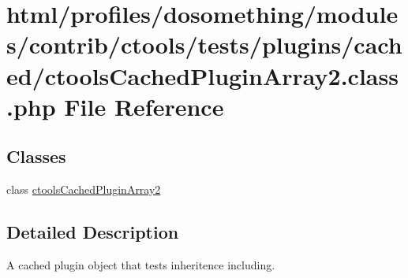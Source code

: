 \hypertarget{ctoolsCachedPluginArray2_8class_8php}{
\section{html/profiles/dosomething/modules/contrib/ctools/tests/plugins/cached/ctoolsCachedPluginArray2.class.php File Reference}
\label{ctoolsCachedPluginArray2_8class_8php}
}
\subsection*{Classes}
\begin{DoxyCompactItemize}
\item 
class \hyperlink{classctoolsCachedPluginArray2}{ctoolsCachedPluginArray2}
\end{DoxyCompactItemize}


\subsection{Detailed Description}
A cached plugin object that tests inheritence including. 